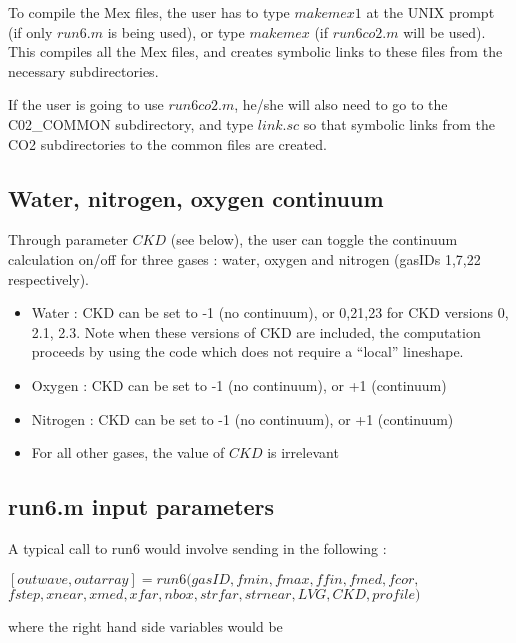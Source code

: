 \documentclass[11pt]{article}
\begin{document}
To compile the Mex files, the user has to type $makemex1$ at the UNIX 
prompt 
(if only $run6.m$ is being used), or type $makemex$ (if $run6co2.m$ will be 
used). This compiles all the Mex files, and creates symbolic links to these
files from the necessary subdirectories.

If the user is going to use $run6co2.m$, he/she will also need to go to the 
C02\_COMMON subdirectory, and type $link.sc$ so that symbolic links from the
CO2 subdirectories to the common files are created.

\subsection{Water, nitrogen, oxygen continuum}
Through parameter $CKD$ (see below), the user can toggle the continuum 
calculation on/off for three gases : water, oxygen and nitrogen 
(gasIDs 1,7,22 respectively). 

\begin{itemize}
\item Water : CKD can be set to -1 (no continuum), or 0,21,23 for CKD 
              versions 0, 2.1, 2.3. Note when these versions of CKD 
              are included, the computation proceeds by using the code which
              does not require a ``local'' lineshape.
\item Oxygen : CKD can be set to -1 (no continuum), or +1 (continuum)
\item Nitrogen : CKD can be set to -1 (no continuum), or +1 (continuum)
\item For all other gases, the value of $CKD$ is irrelevant
\end{itemize}

\subsection{run6.m input parameters}

A typical call to run6 would involve sending in the following : 

$[outwave,outarray]=run6(gasID,fmin,fmax,ffin,fmed,fcor,$\\
         $fstep,xnear,xmed,xfar,nbox,strfar,strnear,LVG,CKD,profile)$

where the right hand side variables would be 
\end{document}
